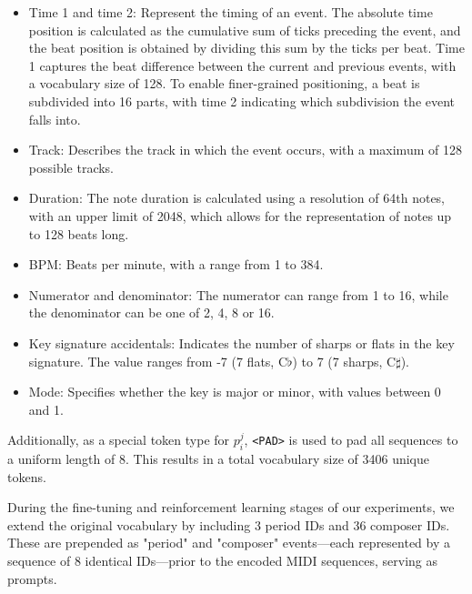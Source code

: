 \begin{itemize}

\item Time 1 and time 2: Represent the timing of an event. The absolute time position is calculated as the cumulative sum of ticks preceding the event, and the beat position is obtained by dividing this sum by the ticks per beat. Time 1 captures the beat difference between the current and previous events, with a vocabulary size of 128. To enable finer-grained positioning, a beat is subdivided into 16 parts, with time 2 indicating which subdivision the event falls into.

\item Track: Describes the track in which the event occurs, with a maximum of 128 possible tracks.

\item Duration: The note duration is calculated using a resolution of 64th notes, with an upper limit of 2048, which allows for the representation of notes up to 128 beats long.

\item BPM: Beats per minute, with a range from 1 to 384.

\item Numerator and denominator: The numerator can range from 1 to 16, while the denominator can be one of 2, 4, 8 or 16.

\item Key signature accidentals: Indicates the number of sharps or flats in the key signature. The value ranges from -7 (7 flats, C$\flat$) to 7 (7 sharps, C$\sharp$).

\item Mode: Specifies whether the key is major or minor, with values between 0 and 1.

\end{itemize}

Additionally, as a special token type for $p_i^j$, \texttt{<PAD>} is used to pad all sequences to a uniform length of 8. This results in a total vocabulary size of 3406 unique tokens.

During the fine-tuning and reinforcement learning stages of our experiments, we extend the original vocabulary by including 3 period IDs and 36 composer IDs. These are prepended as "period" and "composer" events—each represented by a sequence of 8 identical IDs—prior to the encoded MIDI sequences, serving as prompts.

